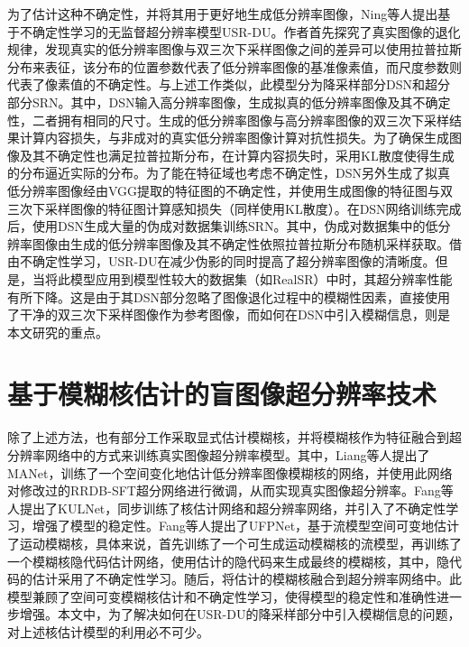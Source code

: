 为了估计这种不确定性，并将其用于更好地生成低分辨率图像，Ning等人\parencite{ijcai2022p176}提出基于不确定性学习的无监督超分辨率模型USR-DU。作者首先探究了真实图像的退化规律，发现真实的低分辨率图像与双三次下采样图像之间的差异可以使用拉普拉斯分布来表征，该分布的位置参数代表了低分辨率图像的基准像素值，而尺度参数则代表了像素值的不确定性。与上述工作类似，此模型分为降采样部分DSN和超分部分SRN。其中，DSN输入高分辨率图像，生成拟真的低分辨率图像及其不确定性，二者拥有相同的尺寸。生成的低分辨率图像与高分辨率图像的双三次下采样结果计算内容损失，与非成对的真实低分辨率图像计算对抗性损失。为了确保生成图像及其不确定性也满足拉普拉斯分布，在计算内容损失时，采用KL散度使得生成的分布逼近实际的分布。为了能在特征域也考虑不确定性，DSN另外生成了拟真低分辨率图像经由VGG提取的特征图的不确定性，并使用生成图像的特征图与双三次下采样图像的特征图计算感知损失（同样使用KL散度）。在DSN网络训练完成后，使用DSN生成大量的伪成对数据集训练SRN。其中，伪成对数据集中的低分辨率图像由生成的低分辨率图像及其不确定性依照拉普拉斯分布随机采样获取。借由不确定性学习，USR-DU在减少伪影的同时提高了超分辨率图像的清晰度。但是，当将此模型应用到模型性较大的数据集（如RealSR）中时，其超分辨率性能有所下降。这是由于其DSN部分忽略了图像退化过程中的模糊性因素，直接使用了干净的双三次下采样图像作为参考图像，而如何在DSN中引入模糊信息，则是本文研究的重点。

\section{基于模糊核估计的盲图像超分辨率技术}
除了上述方法，也有部分工作采取显式估计模糊核，并将模糊核作为特征融合到超分辨率网络中的方式来训练真实图像超分辨率模型。其中，Liang等人\parencite{liang2021mutual}提出了MANet，训练了一个空间变化地估计低分辨率图像模糊核的网络，并使用此网络对修改过的RRDB-SFT超分网络进行微调，从而实现真实图像超分辨率。Fang等人\parencite{fang2022uncertainty}提出了KULNet，同步训练了核估计网络和超分辨率网络，并引入了不确定性学习，增强了模型的稳定性。Fang等人\parencite{fangself}提出了UFPNet，基于流模型空间可变地估计了运动模糊核，具体来说，首先训练了一个可生成运动模糊核的流模型，再训练了一个模糊核隐代码估计网络，使用估计的隐代码来生成最终的模糊核，其中，隐代码的估计采用了不确定性学习。随后，将估计的模糊核融合到超分辨率网络中。此模型兼顾了空间可变模糊核估计和不确定性学习，使得模型的稳定性和准确性进一步增强。本文中，为了解决如何在USR-DU的降采样部分中引入模糊信息的问题，对上述核估计模型的利用必不可少。

